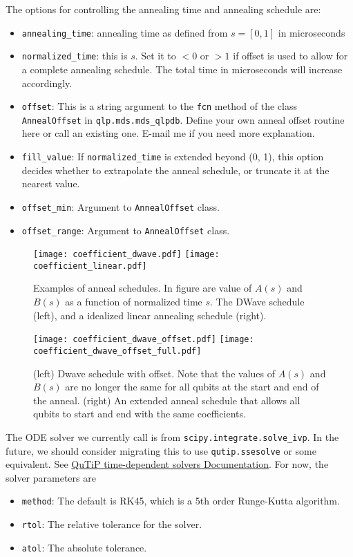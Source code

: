 \documentclass[]{article}
\begin{document}
The options for controlling the annealing time and annealing schedule are:
\begin{itemize}
	\item \texttt{annealing\_time}: annealing time as defined from $s=[0, 1]$ in microseconds
	\item \texttt{normalized\_time}: this is $s$. Set it to $<0$ or $>1$ if offset is used to allow for a complete annealing schedule. The total time in microseconds will increase accordingly.
	\item \texttt{offset}: This is a string argument to the \texttt{fcn} method of the class \texttt{AnnealOffset} in \texttt{qlp.mds.mds\_qlpdb}. Define your own anneal offset routine here or call an existing one. E-mail me if you need more explanation.
	\item \texttt{fill\_value}: If \texttt{normalized\_time} is extended beyond (0, 1), this option decides whether to extrapolate the anneal schedule, or truncate it at the nearest value.
	\item \texttt{offset\_min}: Argument to \texttt{AnnealOffset} class.
	\item \texttt{offset\_range}: Argument to \texttt{AnnealOffset} class.
\end{itemize}

\begin{figure}[htb]
	\centering
	\texttt{[image: coefficient\_dwave.pdf]}
	\texttt{[image: coefficient\_linear.pdf]}
	\caption{\label{fig:anneal_schedules} Examples of anneal schedules. In figure are value of $A(s)$ and $B(s)$ as a function of normalized time $s$. The DWave schedule (left), and a idealized linear annealing schedule (right).
	}
\end{figure}

\begin{figure}[htb]
	\centering
	\texttt{[image: coefficient\_dwave\_offset.pdf]}
	\texttt{[image: coefficient\_dwave\_offset\_full.pdf]}
	\caption{\label{fig:anneal_offset} (left) Dwave schedule with offset. Note that the values of $A(s)$ and $B(s)$ are no longer the same for all qubits at the start and end of the anneal. (right) An extended anneal schedule that allows all qubits to start and end with the same coefficients.
	}
\end{figure}

The ODE solver we currently call is from \texttt{scipy.integrate.solve\_ivp}. In the future, we should consider migrating this to use \texttt{qutip.ssesolve} or some equivalent. See \href{http://qutip.org/docs/latest/guide/dynamics/dynamics-time.html}{QuTiP time-dependent solvers Documentation}. For now, the solver parameters are
\begin{itemize}
	\item \texttt{method}: The default is RK45, which is a 5th order Runge-Kutta algorithm.
	\item \texttt{rtol}: The relative tolerance for the solver.
	\item \texttt{atol}: The absolute tolerance.
\end{itemize}
\end{document}
